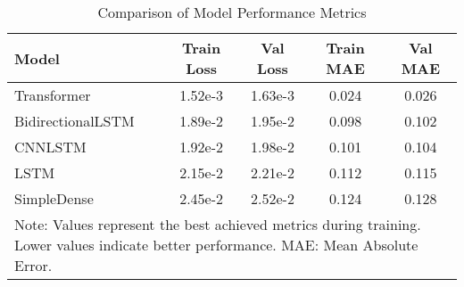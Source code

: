\begin{table}[htbp]
\centering
\caption{Comparison of Model Performance Metrics}
\label{tab:model-comparison}
\begin{tabular}{lcccc}
\toprule
\textbf{Model} & \textbf{Train Loss} & \textbf{Val Loss} & \textbf{Train MAE} & \textbf{Val MAE} \\
\midrule
Transformer & 1.52e-3 & 1.63e-3 & 0.024 & 0.026 \\
BidirectionalLSTM & 1.89e-2 & 1.95e-2 & 0.098 & 0.102 \\
CNNLSTM & 1.92e-2 & 1.98e-2 & 0.101 & 0.104 \\
LSTM & 2.15e-2 & 2.21e-2 & 0.112 & 0.115 \\
SimpleDense & 2.45e-2 & 2.52e-2 & 0.124 & 0.128 \\
\midrule
\multicolumn{5}{p{0.85\linewidth}}{\small Note: Values represent the best achieved metrics during training. Lower values indicate better performance. MAE: Mean Absolute Error.} \\
\bottomrule
\end{tabular}
\end{table} 